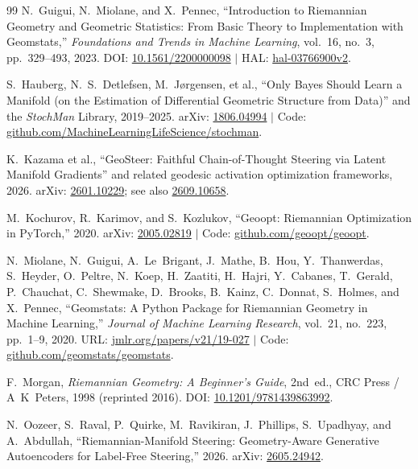 \documentclass[11pt,a4paper]{article}
\theoremstyle{definition}
\begin{document}
\begin{thebibliography}{99}
N.~Guigui, N.~Miolane, and X.~Pennec,
``Introduction to Riemannian Geometry and Geometric Statistics: From Basic Theory to Implementation with Geomstats,''
\emph{Foundations and Trends in Machine Learning}, vol.~16, no.~3, pp.~329--493, 2023.
DOI: \href{https://doi.org/10.1561/2200000098}{10.1561/2200000098} $\mid$
HAL: \href{https://inria.hal.science/hal-03766900v2}{hal-03766900v2}.

S.~Hauberg, N.~S.~Detlefsen, M.~J\o{}rgensen, et al.,
``Only Bayes Should Learn a Manifold (on the Estimation of Differential Geometric Structure from Data)'' and the \emph{StochMan} Library, 2019--2025.
arXiv: \href{https://arxiv.org/abs/1806.04994}{1806.04994} $\mid$
Code: \href{https://github.com/MachineLearningLifeScience/stochman}{github.com/MachineLearningLifeScience/stochman}.

K.~Kazama et al.,
``GeoSteer: Faithful Chain-of-Thought Steering via Latent Manifold Gradients'' and related geodesic activation optimization frameworks, 2026.
arXiv: \href{https://arxiv.org/abs/2601.10229}{2601.10229}; see also \href{https://arxiv.org/abs/2609.10658}{2609.10658}.

M.~Kochurov, R.~Karimov, and S.~Kozlukov,
``Geoopt: Riemannian Optimization in PyTorch,'' 2020.
arXiv: \href{https://arxiv.org/abs/2005.02819}{2005.02819} $\mid$
Code: \href{https://github.com/geoopt/geoopt}{github.com/geoopt/geoopt}.

N.~Miolane, N.~Guigui, A.~Le~Brigant, J.~Mathe, B.~Hou, Y.~Thanwerdas, S.~Heyder, O.~Peltre, N.~Koep, H.~Zaatiti, H.~Hajri, Y.~Cabanes, T.~Gerald, P.~Chauchat, C.~Shewmake, D.~Brooks, B.~Kainz, C.~Donnat, S.~Holmes, and X.~Pennec,
``Geomstats: A Python Package for Riemannian Geometry in Machine Learning,''
\emph{Journal of Machine Learning Research}, vol.~21, no.~223, pp.~1--9, 2020.
URL: \href{https://jmlr.org/papers/v21/19-027.html}{jmlr.org/papers/v21/19-027} $\mid$
Code: \href{https://github.com/geomstats/geomstats}{github.com/geomstats/geomstats}.

F.~Morgan,
\emph{Riemannian Geometry: A Beginner's Guide}, 2nd~ed.,
CRC Press / A~K~Peters, 1998 (reprinted 2016).
DOI: \href{https://doi.org/10.1201/9781439863992}{10.1201/9781439863992}.

N.~Oozeer, S.~Raval, P.~Quirke, M.~Ravikiran, J.~Phillips, S.~Upadhyay, and A.~Abdullah,
``Riemannian-Manifold Steering: Geometry-Aware Generative Autoencoders for Label-Free Steering,'' 2026.
arXiv: \href{https://arxiv.org/abs/2605.24942}{2605.24942}.


\end{thebibliography}
\end{document}
